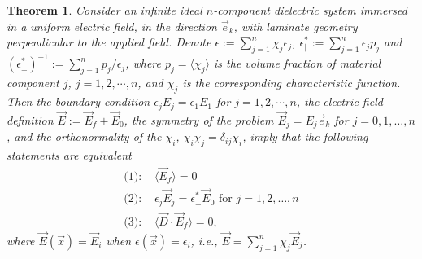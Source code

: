 \documentclass[english,12pt]{ttuthes}
\newtheorem{theorem}{Theorem}[chapter]
\begin{document}
\begin{theorem}\label{thm:parallel_Laminate_Equivalence}
%
Consider an infinite ideal $n$-component dielectric system immersed
in a uniform electric field, in the direction $\vec{e}_k$, with laminate 
geometry perpendicular to the applied field. Denote $\epsilon:=\sum_{j=1}^n \chi_j\epsilon_j$,
$\epsilon^*_\parallel:=\sum_{j=1}^n\epsilon_jp_j$ and $(\epsilon^*_\perp)^{-1}:=\sum_{j=1}^n p_j/\epsilon_j$, where
$p_j=\langle\chi_j\rangle$ is the volume fraction of material component $j$,
$j=1,2,\cdots,n$, and $\chi_j$ is the corresponding characteristic
function. Then the boundary condition $\epsilon_jE_j=\epsilon_1E_1$ for $j=1,2,\cdots,n$,
the electric field definition $\vec{E}:=\vec{E}_f+\vec{E}_0$, the
symmetry of the problem $\vec{E}_j=E_j\vec{e}_k$ for $j=0,1,\ldots,n$, and
the orthonormality of the $\chi_i$, $\chi_i\chi_j=\delta_{ij}\chi_i$, imply that the
following statements are equivalent  
%
\begin{align*}
  \text{(1): } &\langle\vec{E}_f\rangle=0 \\
  \text{(2): } &\epsilon_j\vec{E}_j=\epsilon^*_\perp\vec{E}_0 \text{ for } j=1,2,\ldots,n \\
  \text{(3): } &\langle\vec{D}\cdot\vec{E}_f\rangle=0,
\end{align*}
%
where $\vec{E}(\vec{x})=\vec{E}_i$ when $\epsilon(\vec{x})=\epsilon_i$, i.e.,
$\vec{E}=\sum_{j=1}^n\chi_j\vec{E}_j$.
%
\end{theorem}
%
\end{document}
